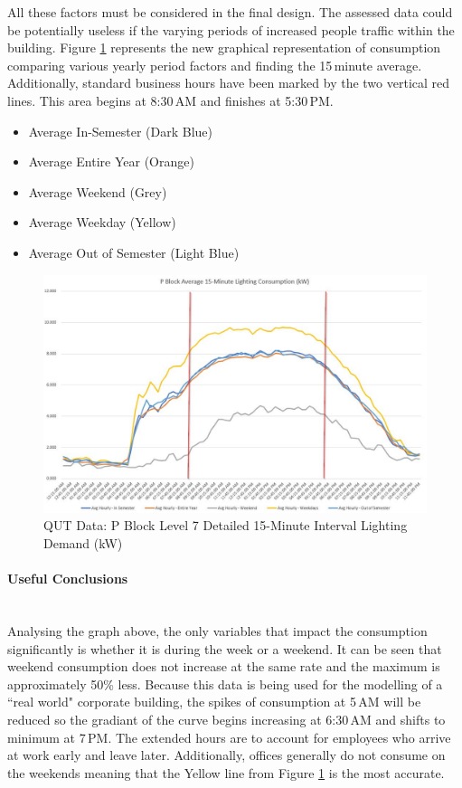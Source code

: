 All these factors must be considered in the final design. The assessed data could be potentially useless if the varying periods of increased people traffic within the building. Figure \ref {fig:pblock-lvl7-15-minute-detailed} represents the new graphical representation of consumption comparing various yearly period factors and finding the 15\,minute average. Additionally, standard business hours have been marked by the two vertical red lines. This area begins at 8:30\,AM and finishes at 5:30\,PM.  

\begin{itemize} [noitemsep]
	\item Average In-Semester (Dark Blue)
	\item Average Entire Year (Orange)
	\item Average Weekend (Grey)
	\item Average Weekday (Yellow)
	\item Average Out of Semester (Light Blue)
\end{itemize}

\begin{figure}[H]
	\hfill\includegraphics[width = 150mm]{images/metering/pme/pblock-lvl7-daily-avg-kw-detailed}\hspace*{\fill}
	\caption{QUT Data: P Block Level 7 Detailed 15-Minute Interval Lighting Demand (kW)} 
	\label{fig:pblock-lvl7-15-minute-detailed}
\end{figure}
  
\paragraph{Useful Conclusions}
~\\
Analysing the graph above, the only variables that impact the consumption significantly is whether it is during the week or a weekend. It can be seen that weekend consumption does not increase at the same rate and the maximum is approximately 50\% less. Because this data is being used for the modelling of a ``real world" corporate building, the spikes of consumption at 5\,AM will be reduced so the gradiant of the curve begins increasing at 6:30\,AM and shifts to minimum at 7\,PM. The extended hours are to account for employees who arrive at work early and leave later.  Additionally, offices generally do not consume on the weekends meaning that the Yellow line from Figure \ref{fig:pblock-lvl7-15-minute-detailed} is the most accurate.   
 
\newpage